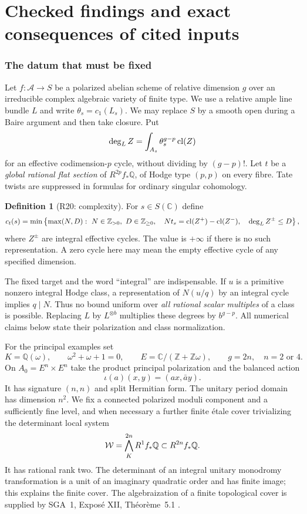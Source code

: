 \documentclass[11pt,a4paper]{article}
\theoremstyle{definition}\newtheorem{definition}[theorem]{Definition}
\theoremstyle{remark}\newtheorem{remark}[theorem]{Remark}
\newcommand{\Q}{\mathbb Q}\newcommand{\Z}{\mathbb Z}\newcommand{\C}{\mathbb C}\newcommand{\R}{\mathbb R}
\begin{document}
\tableofcontents
\newpage
\part{Checked findings and exact consequences of cited inputs}

\section{The datum that must be fixed}
Let $f:\mathcal A\to S$ be a polarized abelian scheme of relative dimension $g$ over an irreducible complex algebraic variety of finite type. We use a relative ample line bundle $L$ and write $\theta_s=c_1(L_s)$. We may replace $S$ by a smooth open during a Baire argument and then take closure. Put
\[
 \deg_L Z=\int_{A_s}\theta_s^{g-p}\operatorname{cl}(Z)
\]
for an effective codimension-$p$ cycle, without dividing by $(g-p)!$. Let $t$ be a \emph{global rational flat section} of $R^{2p}f_*\Q$, of Hodge type $(p,p)$ on every fibre. Tate twists are suppressed in formulas for ordinary singular cohomology.

\begin{definition}[R20: complexity]
For $s\in S(\C)$ define
\[
 c_t(s)=\min\left\{\max(N,D):\ N\in\Z_{>0},\ D\in\Z_{\ge0},\quad
 Nt_s=\cl(Z^+)-\cl(Z^-),\quad \deg_L Z^\pm\le D\right\},
\]
where $Z^\pm$ are integral effective cycles. The value is $+\infty$ if there is no such representation. A zero cycle here may mean the empty effective cycle of any specified dimension.
\end{definition}

The fixed target and the word ``integral'' are indispensable. If $u$ is a primitive nonzero integral Hodge class, a representation of $N(u/q)$ by an integral cycle implies $q\mid N$. Thus no bound uniform over \emph{all rational scalar multiples} of a class is possible. Replacing $L$ by $L^{\otimes b}$ multiplies these degrees by $b^{g-p}$. All numerical claims below state their polarization and class normalization.

For the principal examples set
\[
 K=\Q(\omega),\qquad \omega^2+\omega+1=0,\qquad
 E=\C/(\Z+\Z\omega),\qquad g=2n,\quad n=2\text{ or }4.
\]
On $A_0=E^n\times E^n$ take the product principal polarization and the balanced action
\begin{equation}\label{eq:balanced}
 \iota(a)(x,y)=(ax,\bar a y).
\end{equation}
It has signature $(n,n)$ and split Hermitian form. The unitary period domain has dimension $n^2$. We fix a connected polarized moduli component and a sufficiently fine level, and when necessary a further finite \'{e}tale cover trivializing the determinant local system
\[
 \cW=\bigwedge_K^{2n}R^1f_*\Q\subset R^{2n}f_*\Q.
\]
It has rational rank two. The determinant of an integral unitary monodromy transformation is a unit of an imaginary quadratic order and has finite image; this explains the finite cover. The algebraization of a finite topological cover is supplied by SGA~1, Expos\'e XII, Th\'eor\`eme~5.1 \citep{SGA1}.
\end{document}
